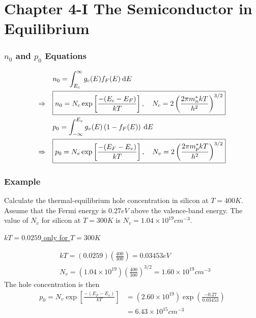 \documentclass{beamer}
\begin{document}
\section{Chapter 4-I The Semiconductor in Equilibrium}
    \begin{frame} \frametitle{$n_0$ and $p_0$ Equations}
        \begin{equation*}
            \begin{aligned}
                &n_0 = \int_{E_c}^\infty g_c(E) f_F(E) \: \mathrm{d} E \\
                \Rightarrow \quad &\boxed{n_0 = N_c \exp \left[ \frac{-(E_c - E_F)}{kT}  \right], \quad N_c = 2 \left( \frac{2\pi m_n^* kT}{h^2}  \right)^{3/2}} \\
                &p_0 = \int_{-\infty}^{E_v} g_v(E) \left(1 - f_F(E)\right) \: \mathrm{d} E \\
                \Rightarrow \quad &\boxed{p_0 = N_v \exp\left[ \frac{-(E_F - E_v)}{kT}  \right], \quad N_v = 2 \left( \frac{2\pi m_p^* kT}{h^2}  \right)^{3/2}}
            \end{aligned}
        \end{equation*}
    \end{frame}

    \begin{frame} \frametitle{Example}
        \par Calculate the thermal-equilibrium hole concentration in silicon at $T = 400K$. Assume that the Fermi energy is $0.27eV$ above the valence-band energy. The value of $N_v$ for silicon at $T = 300K$ is $N_v = 1.04 \times 10^{19} cm^{-3}$.
        \vspace{2em}
        \begin{center}
            \underline{$kT = 0.0259$ only for $T = 300K$}
        \end{center}
        \begin{equation*}
            \begin{aligned}
                &kT = (0.0259) \left( \frac{400}{300}  \right) = 0.03453 eV\\
                &N_v = (1.04 \times 10^{19}) \left( \frac{400}{300}  \right)^{3/2} = 1.60 \times 10^{19} cm^{-3}
            \end{aligned}
        \end{equation*}
        The hole concentration is then 
        \begin{equation*}
            \begin{aligned}
                p_0 = N_v \exp \left[ \frac{- (E_F - E_v)}{kT}  \right] &= (2.60 \times 10^{19}) \exp\left( \frac{-0.27}{0.03453}  \right) \\ &= 6.43 \times 10^{15} cm^{-3}
            \end{aligned}
        \end{equation*}
    \end{frame}
\end{document}
